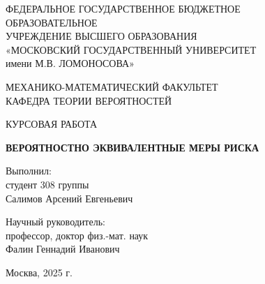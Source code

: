 \documentclass[12pt]{article}
\theoremstyle{plain}
\theoremstyle{definition}
\theoremstyle{remark}
\begin{document}
\begin{titlepage}
\begin{center}
    {\Large 
    ФЕДЕРАЛЬНОЕ ГОСУДАРСТВЕННОЕ БЮДЖЕТНОЕ \\
    ОБРАЗОВАТЕЛЬНОЕ \\
    УЧРЕЖДЕНИЕ ВЫСШЕГО ОБРАЗОВАНИЯ \\
    \vspace{0.5em} 
    «МОСКОВСКИЙ ГОСУДАРСТВЕННЫЙ УНИВЕРСИТЕТ \\
    имени М.В. ЛОМОНОСОВА»

    \vspace{3em} 

    МЕХАНИКО-МАТЕМАТИЧЕСКИЙ ФАКУЛЬТЕТ \\
    \vspace{1.5em} 
    КАФЕДРА ТЕОРИИ ВЕРОЯТНОСТЕЙ
    } 
\end{center}

\vspace{2em} 

\begin{center}
   \Large КУРСОВАЯ РАБОТА
\end{center} 

\begin{center}
    \Large 
    \textbf{ВЕРОЯТНОСТНО ЭКВИВАЛЕНТНЫЕ МЕРЫ РИСКА}
\end{center}

\vfill


\noindent\hspace*{0.47\textwidth}
\begin{minipage}[t]{0.47\textwidth} 
    \raggedright 
    
    \large Выполнил: \\
    \large студент 308 группы \\
    \large Салимов Арсений Евгеньевич
    \vspace{2.5em} 

    \large Научный руководитель: \\ 
    \large профессор, доктор физ.-мат. наук \\ 
    \large Фалин Геннадий Иванович 
    \vspace{2.5em} 
    
\end{minipage}

\vspace*{\fill} 

\begin{center}
    Москва, 2025 г.
\end{center}

\end{titlepage}
\end{document}
